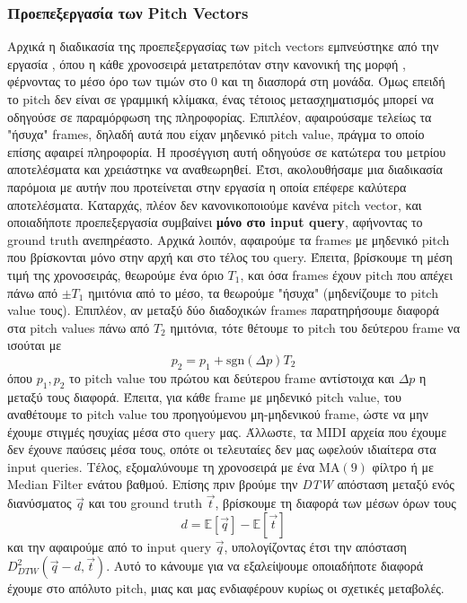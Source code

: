 \subsubsection{Προεπεξεργασία των Pitch Vectors}
Αρχικά η διαδικασία της προεπεξεργασίας των pitch vectors εμπνεύστηκε από την εργασία \cite{Zhu:2003:WIE:872757.872780}, όπου η κάθε χρονοσειρά μετατρεπόταν
στην κανονική της μορφή \cite{goldin1995similarity}, φέρνοντας το μέσο όρο των τιμών στο 0 και τη διασπορά στη μονάδα. Όμως επειδή το
pitch δεν είναι σε γραμμική κλίμακα, ένας τέτοιος μετασχηματισμός μπορεί να οδηγούσε σε παραμόρφωση της πληροφορίας. Επιπλέον, αφαιρούσαμε
τελείως τα "ήσυχα" frames, δηλαδή αυτά που είχαν μηδενικό pitch value, πράγμα το οποίο επίσης αφαιρεί πληροφορία. Η προσέγγιση αυτή
οδηγούσε σε κατώτερα του μετρίου αποτελέσματα και χρειάστηκε να αναθεωρηθεί. Έτσι, ακολουθήσαμε μια διαδικασία παρόμοια με αυτήν που
προτείνεται στην εργασία \cite{stasiak2014follow} η οποία επέφερε καλύτερα αποτελέσματα. Καταρχάς, πλέον δεν κανονικοποιούμε κανένα pitch vector,
και οποιαδήποτε προεπεξεργασία συμβαίνει \textbf{μόνο στο input query}, αφήνοντας το ground truth ανεπηρέαστο. Αρχικά λοιπόν, αφαιρούμε τα frames
με μηδενικό pitch που βρίσκονται μόνο στην αρχή και στο τέλος του query. Έπειτα, βρίσκουμε τη μέση τιμή της χρονοσειράς, θεωρούμε ένα όριο
$T_1$, και όσα frames έχουν pitch που απέχει πάνω από $\pm T_1$ ημιτόνια από το μέσο, τα θεωρούμε "ήσυχα" (μηδενίζουμε το pitch value
τους). Επιπλέον, αν μεταξύ δύο διαδοχικών frames παρατηρήσουμε διαφορά στα pitch values πάνω από $T_2$ ημιτόνια, τότε θέτουμε το pitch του
δεύτερου frame να ισούται με
$$p_2 = p_1 + \mathrm{sgn}(\Delta p) T_2$$
όπου $p_1, p_2$ το pitch value του πρώτου και δεύτερου frame αντίστοιχα και $\Delta p$ η μεταξύ τους διαφορά. Έπειτα, για κάθε frame με
μηδενικό pitch value, του αναθέτουμε το pitch value του προηγούμενου μη-μηδενικού frame, ώστε να μην έχουμε στιγμές ησυχίας μέσα στο query
μας. Άλλωστε, τα MIDI αρχεία που έχουμε δεν έχουνε παύσεις μέσα τους, οπότε οι τελευταίες δεν μας ωφελούν ιδιαίτερα στα input queries.
Τέλος, εξομαλύνουμε τη χρονοσειρά με ένα $\mathrm{MA}(9)$ φίλτρο ή με Median Filter ενάτου βαθμού. Επίσης πριν βρούμε την \emph{DTW} απόσταση μεταξύ ενός διανύσματος
$\vec{q}$ και του ground truth $\vec{t}$, βρίσκουμε τη διαφορά των μέσων όρων τους
$$d = \mathbb{E}[\vec{q}] - \mathbb{E}[\vec{t}]$$
και την αφαιρούμε από το input query $\vec{q}$, υπολογίζοντας έτσι την απόσταση $D^2_{DTW}(\vec{q} - d, \vec{t})$. Αυτό το
κάνουμε για να εξαλείψουμε οποιαδήποτε διαφορά έχουμε στο απόλυτο pitch, μιας και μας ενδιαφέρουν κυρίως οι σχετικές μεταβολές.


